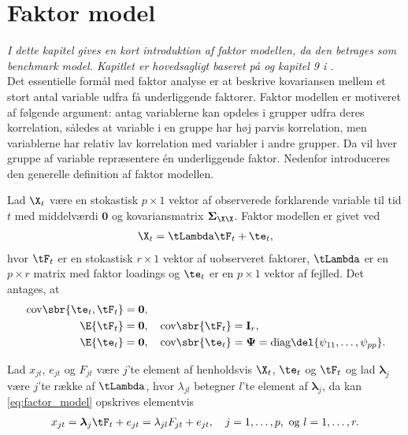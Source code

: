\chapter{Faktor model} \label{ch:dfm}
\textit{I dette kapitel gives en kort introduktion af faktor modellen, da den betrages som benchmark model. Kapitlet er hovedsagligt baseret på \citep{stock_watson_2002a} og kapitel 9 i \citep{faktorbook}.} \\[4mm]
%
Det essentielle formål med faktor analyse er at beskrive kovariansen mellem et stort antal variable udfra få underliggende faktorer.
Faktor modellen er motiveret af følgende argument: antag variablerne kan opdeles i grupper udfra deres korrelation, således at variable i en gruppe har høj parvis korrelation, men variablerne har relativ lav korrelation med variabler i andre grupper.
Da vil hver gruppe af variable repræsentere én underliggende faktor.
Nedenfor introduceres den generelle definition af faktor modellen.
%
\begin{defn} \label{def:faktor_model}
Lad \(\X_t\) være en stokastisk \(p \times 1\) vektor af observerede forklarende variable til tid \(t\) med middelværdi \(\mathbf{0}\) og kovariansmatrix \(\boldsymbol{\Sigma}_{\X \X}\).
Faktor modellen er givet ved
\begin{align}
\X_t = \tLambda \tF_t + \te_t, \label{eq:factor_model}
\end{align}
hvor \(\tF_t\) er en stokastisk \(r \times 1\) vektor af uobserveret faktorer, \(\tLambda\) er en \(p \times r\) matrix med faktor loadings og \(\te_t\) er en \(p \times 1\) vektor af fejlled.
Det antages, at
\begin{align*}
\text{cov} \sbr{\te_t, \tF_t} &= \mathbf{0}, \\
\E{\tF_t} &= \mathbf{0}, \quad \text{cov}\sbr{\tF_t} = \mathbf{I}_r, \\
\E{\te_t} &= \mathbf{0}, \quad \text{cov}\sbr{\te_t} = \boldsymbol{\Psi} = \text{diag} \del{\psi_{11}, \ldots, \psi_{pp}}.
\end{align*}
\end{defn}
%
Lad \(x_{jt}\), \( e_{jt}\) og \(F_{jt}\) være \(j\)'te element af henholdsvis \(\X_t\), \(\te_t\) og \(\tF_t\) og lad \(\boldsymbol{\lambda}_j \) være \(j\)'te række af \(\tLambda\), hvor \(\lambda_{jl}\) betegner \(l\)'te element af \(\boldsymbol{\lambda}_j \), da kan \eqref{eq:factor_model} opskrives elementvis
\begin{align*}
x_{jt} = \boldsymbol{\lambda}_j \tF_t + e_{jt} = \lambda_{jl}F_{jt} + e_{jt}, \quad j = 1, \ldots, p, \text{ og } l = 1, \ldots, r.
\end{align*} 
